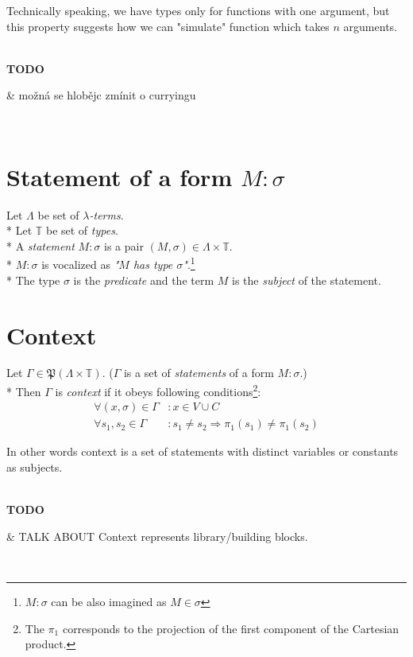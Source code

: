 \documentclass[12pt,a4paper]{report}
\newcommand{\lterms}{$\lambda$-terms\xspace}
\newenvironment{todo}
{ ~\\[0.5em]
  {\color{red}\textbf{TODO}}
  \begin{easylist}[itemize]}
{ \end{easylist}
  ~}
\begin{document}
Technically speaking, we have types only for functions with one argument, but
this property suggests how we can "simulate" function which takes $n$ arguments.
  


\begin{todo}  
   & možná se hlobějc zmínit o curryingu  
\end{todo}

	

	
\section{Statement of a form $M : \sigma$}

	Let $\Lambda$ be set of {\it \lterms}. \\*
	Let $\mathbb{T}$ be set of {\it types}.       \\*
	A {\it statement} $M : \sigma$ is a pair $(M,\sigma) \in \Lambda \times \mathbb{T}$. \\*
	$M : \sigma$ is vocalized as {\it "$M$ has type $\sigma$"}.\footnote{ 
	$M : \sigma$ can be also imagined as $M \in \sigma$ } \\*
	The type $\sigma$ is the {\it predicate} and the term $M$ is the
	{\it subject} of the statement.  
	
\section{Context}

	Let $\Gamma \in \mathfrak P \left({\Lambda \times  \mathbb{T}}\right)$. 
	($\Gamma$ is a set of {\it statements} of a form $M : \sigma$.)	\\*
	Then $\Gamma$ is {\it context} if it obeys following 
	conditions\footnote{
	The $\pi_1$ corresponds to the projection of the first component of the Cartesian product.
	}:
	\begin{align*}
		 \forall (x,\sigma) \in \Gamma &: x \in V \cup C \\
		 \forall s_1,s_2 \in \Gamma &: s_1 \neq s_2 \Rightarrow \pi_1(s_1) \neq \pi_1(s_2)
    \end{align*}
    
	In other words context is a set of statements with distinct variables or constants as subjects.
	
\begin{todo}
 & TALK ABOUT Context represents library/building blocks.
\end{todo}
\end{document}
